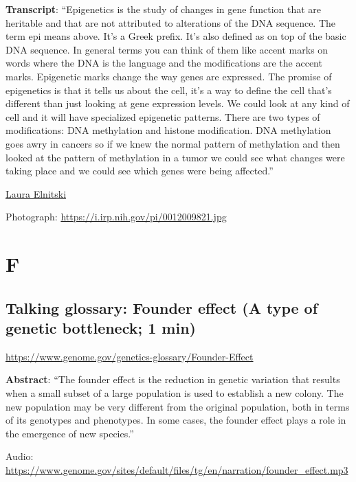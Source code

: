 \documentclass[
]{book}
\begin{document}
\textbf{Transcript}: ``Epigenetics is the study of changes in gene function that are heritable and that are not attributed to alterations of the DNA sequence. The term epi means above. It's a Greek prefix. It's also defined as on top of the basic DNA sequence. In general terms you can think of them like accent marks on words where the DNA is the language and the modifications are the accent marks. Epigenetic marks change the way genes are expressed. The promise of epigenetics is that it tells us about the cell, it's a way to define the cell that's different than just looking at gene expression levels. We could look at any kind of cell and it will have specialized epigenetic patterns. There are two types of modifications: DNA methylation and histone modification. DNA methylation goes awry in cancers so if we knew the normal pattern of methylation and then looked at the pattern of methylation in a tumor we could see what changes were taking place and we could see which genes were being affected.''

\href{https://www.genome.gov/staff/Laura-Elnitski-PhD}{Laura Elnitski}

Photograph: \url{https://i.irp.nih.gov/pi/0012009821.jpg}

\hypertarget{f}{%
\chapter{F}\label{f}}

\hypertarget{talking-glossary-founder-effect-a-type-of-genetic-bottleneck-1-min}{%
\section{Talking glossary: Founder effect (A type of genetic bottleneck; 1 min)}\label{talking-glossary-founder-effect-a-type-of-genetic-bottleneck-1-min}}

\url{https://www.genome.gov/genetics-glossary/Founder-Effect}

\textbf{Abstract}: ``The founder effect is the reduction in genetic variation that results when a small subset of a large population is used to establish a new colony. The new population may be very different from the original population, both in terms of its genotypes and phenotypes. In some cases, the founder effect plays a role in the emergence of new species.''

Audio: \url{https://www.genome.gov/sites/default/files/tg/en/narration/founder_effect.mp3}
\end{document}
